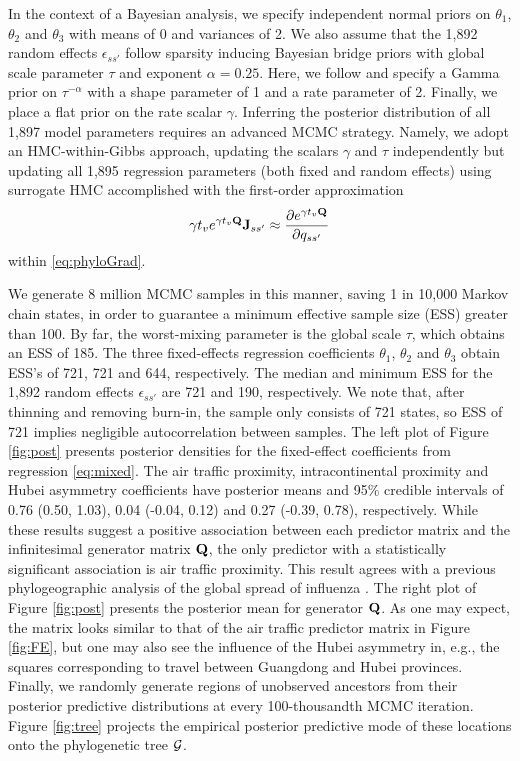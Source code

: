 \documentclass[12pt]{article} %
\newcommand{\phylogeny}{{\cal G}}
\begin{document}
In the context of a Bayesian analysis, we specify independent normal priors on $\theta_1$, $\theta_2$ and $\theta_3$ with means of 0 and variances of 2.  We also assume that the 1,892 random effects $\epsilon_{ss'}$ follow sparsity inducing Bayesian bridge priors with global scale parameter $\tau$ and exponent $\alpha=0.25$.  Here, we follow \citet{nishimura2022shrinkage} and specify a Gamma prior on $\tau^{-\alpha}$ with a shape parameter of 1 and a rate parameter of 2. Finally, we place a flat prior on the rate scalar $\gamma$.  Inferring the posterior distribution of all 1,897 model parameters requires an advanced MCMC strategy. Namely, we adopt an HMC-within-Gibbs approach, updating the scalars $\gamma$ and $\tau$ independently but updating all 1,895 regression parameters (both fixed and random effects) using surrogate HMC accomplished with the first-order approximation
\begin{align*}
  \gamma t_v  e^{\gamma t_v \mathbf{Q}} \mathbf{J}_{ss'}    \approx \frac{\partial e^{\gamma t_v \mathbf{Q}}}{\partial q_{ss'}} 
\end{align*}
within \eqref{eq:phyloGrad}.

We generate 8 million MCMC samples in this manner, saving 1 in 10,000 Markov chain states, in order to guarantee a minimum effective sample size (ESS) greater than 100.  By far, the worst-mixing parameter  is the global scale $\tau$, which obtains an ESS of 185.  The three fixed-effects regression coefficients $\theta_1$, $\theta_2$ and $\theta_3$ obtain ESS's of 721, 721 and 644, respectively.  The median and minimum ESS for the 1,892 random effects $\epsilon_{ss'}$ are 721 and 190, respectively.  We note that, after thinning and removing burn-in, the sample only consists of 721 states, so ESS of 721 implies negligible autocorrelation between samples.  The left plot of Figure \ref{fig:post} presents posterior densities for the fixed-effect coefficients from regression \eqref{eq:mixed}.  The air traffic proximity, intracontinental proximity and Hubei asymmetry coefficients have posterior means and 95\% credible intervals of 0.76 (0.50, 1.03), 0.04 (-0.04, 0.12) and 0.27 (-0.39, 0.78), respectively. While these results suggest a positive association between each predictor matrix and the infinitesimal generator matrix $\mathbf{Q}$, the only predictor with a statistically significant association is air traffic proximity.  This result agrees with a previous phylogeographic analysis of the global spread of influenza \citep{holbrook2021massive}.  The right plot of Figure \ref{fig:post} presents the posterior mean for generator $\mathbf{Q}$.  As one may expect, the matrix looks similar to that of the air traffic predictor matrix in Figure \ref{fig:FE}, but one may also see the influence of the Hubei asymmetry in, e.g., the squares corresponding to travel between Guangdong and Hubei provinces.  Finally, we randomly generate regions of unobserved ancestors from their posterior predictive distributions at every 100-thousandth MCMC iteration.  Figure \ref{fig:tree} projects the empirical posterior predictive mode of these locations onto the phylogenetic tree $\phylogeny$.
\end{document}
